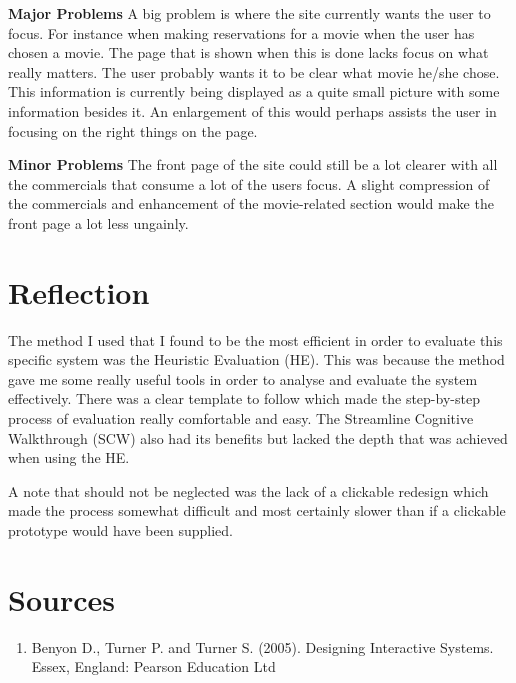 \documentclass[a4paper,11pt]{article}
\begin{document}
\textbf{Major Problems}
A big problem is where the site currently wants the user to focus. For instance when making reservations for a movie when the user has chosen a movie. The page that is shown when this is done lacks focus on what really matters. The user probably wants it to be clear what movie he/she chose. This information is currently being displayed as a quite small picture with some information besides it. An enlargement of this would perhaps assists the user in focusing on the right things on the page. 

\textbf{Minor Problems} 
The front page of the site could still be a lot clearer with all the commercials that consume a lot of the users focus. A slight compression of the commercials and enhancement of the movie-related section would make the front page a lot less ungainly.

\section{Reflection}
The method I used that I found to be the most efficient in order to evaluate this specific system was the Heuristic Evaluation (HE). This was because the method gave me some really useful tools in order to analyse and evaluate the system effectively. There was a clear template to follow which made the step-by-step process of evaluation really comfortable and easy. The Streamline Cognitive Walkthrough (SCW) also had its benefits but lacked the depth that was achieved when using the HE.

A note that should not be neglected was the lack of a clickable redesign which made the process somewhat difficult and most certainly slower than if a clickable prototype would have been supplied.

\section{Sources}

\begin{enumerate}
\item Benyon D., Turner P. and Turner S. (2005). Designing Interactive Systems. Essex, England: Pearson Education Ltd\\

\end{enumerate}
\end{document}
